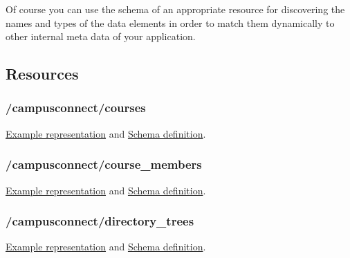 Of course you can use the schema of an appropriate resource for discovering the
names and types of the data elements in order to match them dynamically to
other internal meta data of your application.


\hypertarget{campusconnect_resources}{}
\subsection{Resources}

\hypertarget{campusconnect_cources}{}
\subsubsection{/campusconnect/courses}
\href{https://ecs.uni-stuttgart.de/ecsa-wiki/CampusConnect/Arbeitspakete/EcsREST/CmsCourses}{Example representation} and
\href{http://repo.or.cz/w/ecs.git/blob_plain/HEAD:/campusconnect/schemas/cc\_courses.schema.json}{Schema definition}.

\hypertarget{campusconnect_course_members}{}
\subsubsection{/campusconnect/course\_members}
\href{https://ecs.uni-stuttgart.de/ecsa-wiki/CampusConnect/Arbeitspakete/EcsREST/CmsCourseMembers}{Example representation} and
\href{http://repo.or.cz/w/ecs.git/blob_plain/HEAD:/campusconnect/schemas/cc_course_members.schema.json}{Schema definition}.

\hypertarget{campusconnect_directory_trees}{}
\subsubsection{/campusconnect/directory\_trees}
\href{https://ecs.uni-stuttgart.de/ecsa-wiki/CampusConnect/Arbeitspakete/EcsREST/CmsDirectoryTrees}{Example representation} and
\href{http://repo.or.cz/w/ecs.git/blob_plain/HEAD:/campusconnect/schemas/cc_directory_trees.schema.json}{Schema definition}.



